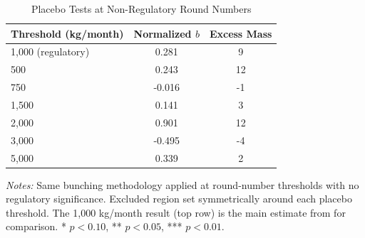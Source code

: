 
\begin{table}[H]
\centering
\caption{Placebo Tests at Non-Regulatory Round Numbers}
\begin{threeparttable}
\begin{tabular}{lcc}
\toprule
Threshold (kg/month) & Normalized $b$ & Excess Mass \\
\midrule
1,000 (regulatory) & 0.281 & 9 \\
\midrule
500 & 0.243 & 12 \\
750 & -0.016 & -1 \\
1,500 & 0.141 & 3 \\
2,000 & 0.901 & 12 \\
3,000 & -0.495 & -4 \\
5,000 & 0.339 & 2 \\
\bottomrule
\end{tabular}
\begin{tablenotes}[flushleft]
\small
\item \textit{Notes:} Same bunching methodology applied at round-number thresholds with no regulatory significance. Excluded region set symmetrically around each placebo threshold. The 1,000 kg/month result (top row) is the main estimate from  for comparison. * $p<0.10$, ** $p<0.05$, *** $p<0.01$.
\end{tablenotes}
\end{threeparttable}
\label{tab:placebo}
\end{table}
